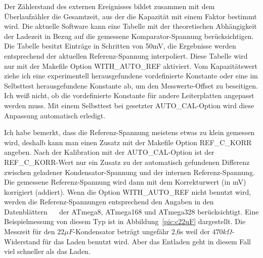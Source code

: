 Der Zählerstand des externen Ereignisses bildet zusammen mit dem Überlaufzähler die Gesamtzeit, aus der die
Kapazität mit einem Faktor bestimmt wird.
Die aktuelle Software kann eine Tabelle mit der theoretischen Abhängigkeit der Ladezeit in Bezug auf die gemessene
Komparator-Spannung berücksichtigen.
Die Tabelle besitzt Einträge in Schritten von 50mV, die Ergebnisse werden entsprechend der aktuellen Referenz-Spannung interpoliert.
Diese Tabelle wird nur mit der Makefile Option WITH\_AUTO\_REF aktiviert.
Vom Kapazitätswert ziehe ich eine experimentell herausgefundene vordefinierte Konstante oder eine im Selbsttest
herausgefundene Konstante ab, um den Messwerte-Offset zu beseitigen.
Ich weiß nicht, ob die vordefinierte Konstante für andere Leiterplatten angepasst werden muss.
Mit einem Selbsttest bei gesetzter AUTO\_CAL-Option wird diese Anpassung automatisch erledigt.

Ich habe bemerkt, dass die Referenz-Spannung meistens etwas zu klein gemessen wird,
 deshalb kann man einen Zusatz mit der Makefile Option REF\_C\_KORR angeben.
Nach der Kalibration mit der AUTO\_CAL-Option ist der REF\_C\_KORR-Wert nur ein Zusatz zu der automatisch
gefundenen Differenz zwischen geladener Kondensator-Spannung und der internen Referenz-Spannung.
Die gemessene Referenz-Spannung wird dann mit dem Korrekturwert (in mV) korrigiert (addiert).
Wenn die Option WITH\_AUTO\_REF nicht benutzt wird, werden die Referenz-Spannungen entsprechend den Angaben in den
Datenblättern ~\cite{ATmega8}~\cite{ATmega168} der ATmega8, ATmega168 und ATmega328 berücksichtigt.
Eine Beispielmessung von diesem Typ ist in Abbildung~\ref{pic:c22uF} dargestellt.
Die Messzeit für den \(22 \mu F\)-Kondensator beträgt ungefähr 2,6s weil der \(470k\Omega\)-Widerstand für das Laden benutzt wird.
Aber das Entladen geht in diesem Fall viel schneller als das Laden.

